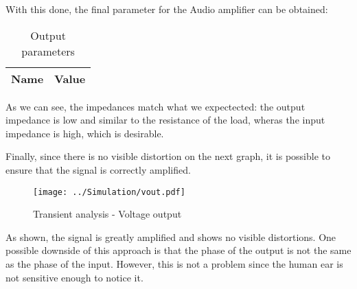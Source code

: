 With this done, the final parameter for the Audio amplifier can be obtained:

\begin{table}[H]
  \centering
  \begin{tabular}{|l|r|}
    \hline    
    {\bf Name} & {\bf Value} \\ \hline
    
  \end{tabular}
  \caption{Output parameters}
  \label{tab: OutputParamNGS}
\end{table}

As we can see, the impedances match what we expectected: the output impedance is low and similar to the resistance of the load, wheras the input impedance is high, which is desirable.


Finally, since there is no visible distortion on the next graph, it is possible to ensure that the signal is correctly amplified.


\begin{figure}[h!]
    \centering
  \texttt{[image: ../Simulation/vout.pdf]}
  \caption{Transient analysis - Voltage output}
  \label{tab:TransNGS}
\end{figure}


As shown, the signal is greatly amplified and shows no visible distortions. One possible downside of this approach is that the phase of the output is not the same as the phase of the input. However, this is not a problem since the human ear is not sensitive enough to notice it.

